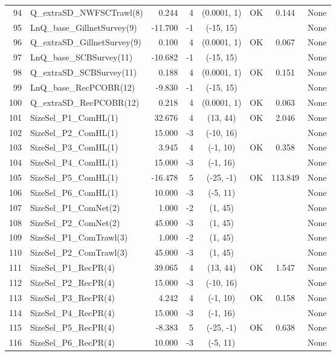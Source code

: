 \documentclass[12pt,]{article}
\begin{document}
\begin{landscape}
\begin{longtable}{rlrrcccl}
  94 & Q\_extraSD\_NWFSCTrawl(8) & 0.244 & 4 & (0.0001, 1) & OK & 0.144 & None \\ 
  95 & LnQ\_base\_GillnetSurvey(9) & -11.700 & -1 & (-15, 15) &  &  & None \\ 
  96 & Q\_extraSD\_GillnetSurvey(9) & 0.100 & 4 & (0.0001, 1) & OK & 0.067 & None \\ 
  97 & LnQ\_base\_SCBSurvey(11) & -10.682 & -1 & (-15, 15) &  &  & None \\ 
  98 & Q\_extraSD\_SCBSurvey(11) & 0.188 & 4 & (0.0001, 1) & OK & 0.151 & None \\ 
  99 & LnQ\_base\_RecPCOBR(12) & -9.830 & -1 & (-15, 15) &  &  & None \\ 
  100 & Q\_extraSD\_RecPCOBR(12) & 0.218 & 4 & (0.0001, 1) & OK & 0.063 & None \\ 
  101 & SizeSel\_P1\_ComHL(1) & 32.676 & 4 & (13, 44) & OK & 2.046 & None \\ 
  102 & SizeSel\_P2\_ComHL(1) & 15.000 & -3 & (-10, 16) &  &  & None \\ 
  103 & SizeSel\_P3\_ComHL(1) & 3.945 & 4 & (-1, 10) & OK & 0.358 & None \\ 
  104 & SizeSel\_P4\_ComHL(1) & 15.000 & -3 & (-1, 16) &  &  & None \\ 
  105 & SizeSel\_P5\_ComHL(1) & -16.478 & 5 & (-25, -1) & OK & 113.849 & None \\ 
  106 & SizeSel\_P6\_ComHL(1) & 10.000 & -3 & (-5, 11) &  &  & None \\ 
  107 & SizeSel\_P1\_ComNet(2) & 1.000 & -2 & (1, 45) &  &  & None \\ 
  108 & SizeSel\_P2\_ComNet(2) & 45.000 & -3 & (1, 45) &  &  & None \\ 
  109 & SizeSel\_P1\_ComTrawl(3) & 1.000 & -2 & (1, 45) &  &  & None \\ 
  110 & SizeSel\_P2\_ComTrawl(3) & 45.000 & -3 & (1, 45) &  &  & None \\ 
  111 & SizeSel\_P1\_RecPR(4) & 39.065 & 4 & (13, 44) & OK & 1.547 & None \\ 
  112 & SizeSel\_P2\_RecPR(4) & 15.000 & -3 & (-10, 16) &  &  & None \\ 
  113 & SizeSel\_P3\_RecPR(4) & 4.242 & 4 & (-1, 10) & OK & 0.158 & None \\ 
  114 & SizeSel\_P4\_RecPR(4) & 15.000 & -3 & (-1, 16) &  &  & None \\ 
  115 & SizeSel\_P5\_RecPR(4) & -8.383 & 5 & (-25, -1) & OK & 0.638 & None \\ 
  116 & SizeSel\_P6\_RecPR(4) & 10.000 & -3 & (-5, 11) &  &  & None \\ 

\end{longtable}
\end{landscape}
\end{document}
